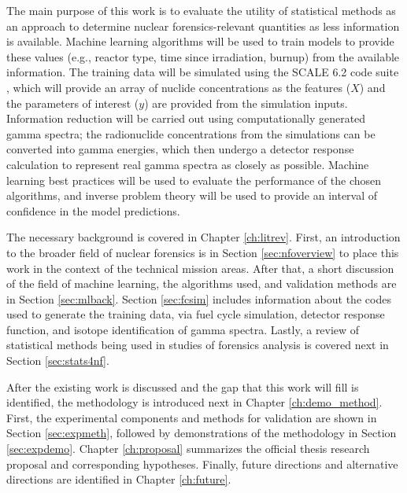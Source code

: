 The main purpose of this work is to evaluate the utility of statistical methods
as an approach to determine nuclear forensics-relevant quantities as less
information is available. Machine learning algorithms will be used to train
models to provide these values (e.g., reactor type, time since irradiation,
burnup) from the available information. The training data will be simulated
using the SCALE 6.2 code suite \cite{scale}, which will provide an array of
nuclide concentrations as the features ($X$) and the parameters of interest
($y$) are provided from the simulation inputs.  Information reduction will be
carried out using computationally generated gamma spectra; the radionuclide
concentrations from the simulations can be converted into gamma energies, which
then undergo a detector response calculation to represent real gamma spectra as
closely as possible. Machine learning best practices will be used to evaluate
the performance of the chosen algorithms, and inverse problem theory will be
used to provide an interval of confidence in the model predictions.

The necessary background is covered in Chapter \ref{ch:litrev}.  First, an
introduction to the broader field of nuclear forensics is in Section
\ref{sec:nfoverview} to place this work in the context of the technical mission
areas. After that, a short discussion of the field of machine learning, the
algorithms used, and validation methods are in Section \ref{sec:mlback}.
Section \ref{sec:fcsim} includes information about the codes used to generate
the training data, via fuel cycle simulation, detector response function, and
isotope identification of gamma spectra.  Lastly, a review of statistical
methods being used in studies of forensics analysis is covered next in Section
\ref{sec:stats4nf}. 


After the existing work is discussed and the gap that this work will fill is
identified, the methodology is introduced next in Chapter \ref{ch:demo_method}.
First, the experimental components and methods for validation are shown in
Section \ref{sec:expmeth}, followed by demonstrations of the methodology in
Section \ref{sec:expdemo}.  Chapter \ref{ch:proposal} summarizes the official
thesis research proposal and corresponding hypotheses. Finally, future
directions and alternative directions are identified in Chapter
\ref{ch:future}.
